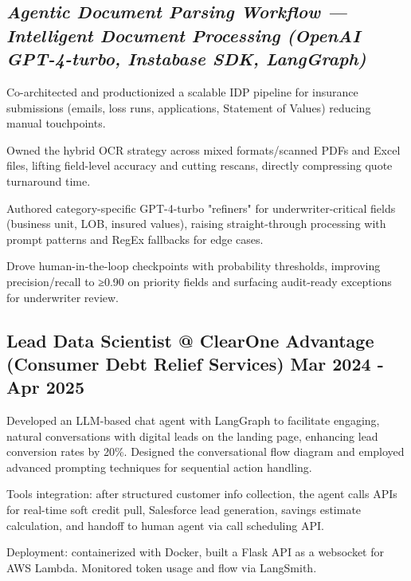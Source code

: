 \documentclass[letter,10pt]{article}
\begin{document}
\subsection{\textbf{\textit{Agentic Document Parsing Workflow — Intelligent Document Processing   (OpenAI GPT-4-turbo, Instabase SDK, LangGraph)}}}
\vspace{0.1em}
\begin{zitemize}
\item Co-architected and productionized a scalable IDP pipeline for insurance submissions (emails, loss runs, applications, Statement of Values) reducing manual touchpoints.
\item Owned the hybrid OCR strategy across mixed formats/scanned PDFs and Excel files, lifting field-level accuracy and cutting rescans, directly compressing quote turnaround time.
\item Authored category-specific GPT-4-turbo "refiners" for underwriter-critical fields (business unit, LOB, insured values), raising straight-through processing with prompt patterns and RegEx fallbacks for edge cases.
\item Drove human-in-the-loop checkpoints with probability thresholds, improving precision/recall to ≥0.90 on priority fields and surfacing audit-ready exceptions for underwriter review.
\end{zitemize}
\vspace{0.6em}

\subsection{Lead Data Scientist @ ClearOne Advantage (Consumer Debt Relief Services) \hfill Mar 2024 - Apr 2025}
\vspace{0.5em}
\begin{zitemize}
\item Developed an LLM-based chat agent with LangGraph to facilitate engaging, natural conversations with digital leads on the landing page, enhancing lead conversion rates by 20\%. Designed the conversational flow diagram and employed advanced prompting techniques for sequential action handling.
\item Tools integration: after structured customer info collection, the agent calls APIs for real-time soft credit pull, Salesforce lead generation, savings estimate calculation, and handoff to human agent via call scheduling API.
\item Deployment: containerized with Docker, built a Flask API as a websocket for AWS Lambda. Monitored token usage and flow via LangSmith.
\end{zitemize}
\end{document}
